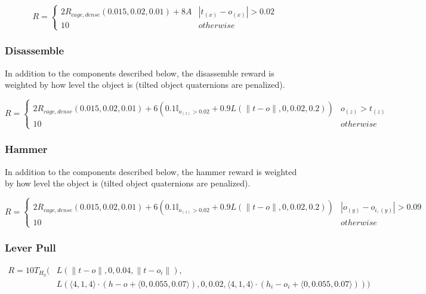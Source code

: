 {\[R=\left\{
\begin{array}{ll}
2R_{cage,dense}(0.015, 0.02, 0.01) + 8A
& |t_{(x)} - o_{(x)}| > 0.02 \\

10 & otherwise
\end{array} \right. 
\]

\subsubsection{Disassemble}
In addition to the components described below, the disassemble reward is weighted by how level the object is (tilted object quaternions are penalized).

\[R=\left\{
\begin{array}{ll}
2R_{cage,dense}(0.015, 0.02, 0.01) +
6 \left( 0.1\mathbb{I}_{o_{(z)} > 0.02} + 0.9L(\lVert t - o \rVert, 0, 0.02, 0.2) \right)
& o_{(z)} > t_{(z)} \\

10 & otherwise
\end{array} \right. 
\]

\subsubsection{Hammer}
In addition to the components described below, the hammer reward is weighted by how level the object is (tilted object quaternions are penalized).

\[R=\left\{
\begin{array}{ll}
2R_{cage,dense}(0.015, 0.02, 0.01) +
6 \left( 0.1\mathbb{I}_{o_{(z)} > 0.02} + 0.9L(\lVert t - o \rVert, 0, 0.02, 0.2) \right)
& |o_{(y)} - o_{i,(y)}| > 0.09 \\

10 & otherwise
\end{array} \right. 
\]

\subsubsection{Lever Pull}

\[
\begin{aligned}
R=10T_{H_0}(
    &L\left(\lVert t - o \rVert, 0, 0.04, \lVert t - o_i \rVert\right), \\
    &L\left(
        \langle4,1,4\rangle \cdot (h - o + \langle0,0.055,0.07\rangle),
        0,
        0.02,
        \langle4,1,4\rangle \cdot (h_i - o_i + \langle0,0.055,0.07\rangle)
    \right)
)\end{aligned}
\]

}
